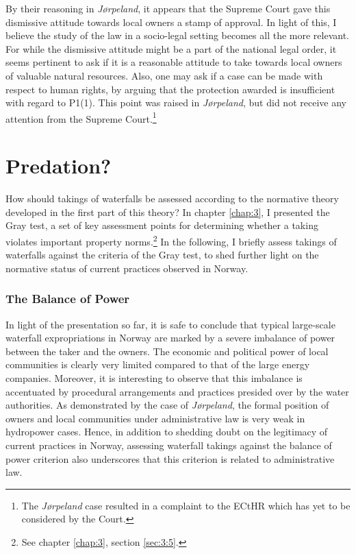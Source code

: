 {By their reasoning in \emph{Jørpeland}, it appears that the Supreme Court gave this dismissive attitude towards local owners a stamp of approval. In light of this, I believe the study of the law in a socio-legal setting becomes all the more relevant. For while the dismissive attitude might be a part of the national legal order, it seems pertinent to ask if it is a reasonable attitude to take towards local owners of valuable natural resources. Also, one may ask if a case can be made with respect to human rights, by arguing that the protection awarded is insufficient with regard to P1(1). This point was raised in \emph{Jørpeland}, but did not receive any attention from the Supreme Court.\footnote{The {\it Jørpeland} case resulted in a complaint to the ECtHR which has yet to be considered by the Court.}
}

\section{Predation?}\label{sec:5:7}

How should takings of waterfalls be assessed according to the normative theory developed in the first part of this theory? In chapter \ref{chap:3}, I presented the Gray test, a set of key assessment points for determining whether a taking violates important property norms.\footnote{See chapter \ref{chap:3}, section \ref{sec:3:5}.} In the following, I briefly assess takings of waterfalls against the criteria of the Gray test, to shed further light on the normative status of current practices observed in Norway.

\subsubsection{The Balance of Power}\label{sec:5:7:1}

In light of the presentation so far, it is safe to conclude that typical large-scale waterfall expropriations in Norway are marked by a severe imbalance of power between the taker and the owners. The economic and political power of local communities is clearly very limited compared to that of the large energy companies. Moreover, it is interesting to observe that this imbalance is accentuated by procedural arrangements and practices presided over by the water authorities. As demonstrated by the case of {\it Jørpeland}, the formal position of owners and local communities under administrative law is very weak in hydropower cases. Hence, in addition to shedding doubt on the legitimacy of current practices in Norway, assessing waterfall takings against the balance of power criterion also underscores that this criterion is related to administrative law.


